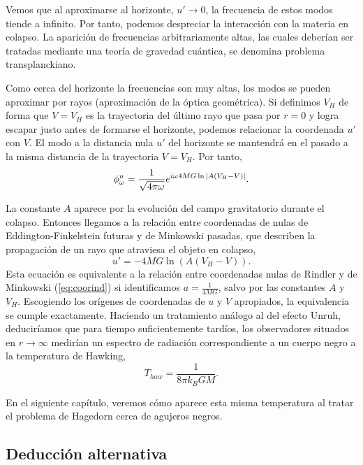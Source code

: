Vemos que al aproximarse al horizonte, $u'\to 0$, la frecuencia de estos modos tiende a infinito.
Por tanto, podemos despreciar la interacción con la materia en colapso.
La aparición de frecuencias arbitrariamente altas, las cuales deberían ser tratadas mediante
una teoría de gravedad cuántica, se denomina problema transplanckiano.

Como cerca del horizonte la frecuencias son muy altas, los modos se pueden aproximar por rayos (aproximación de la óptica geométrica).
Si definimos $V_H$ de forma que $V=V_H$ es la trayectoria del último rayo que pasa por $r=0$
y logra escapar justo antes de formarse el horizonte, podemos relacionar la coordenada
$u'$ con $V$.
El modo a la distancia nula $u'$ del horizonte se mantendrá en el pasado a la misma distancia de la trayectoria $V=V_H$.
Por tanto,
\begin{equation}
  \phi^{u}_\omega = \frac{1}{\sqrt{4\pi\omega}}e^{i\omega 4MG\ln \abs{A(V_H-V)}}.
\end{equation}

La constante $A$ aparece por la evolución del campo gravitatorio durante el colapso.
Entonces llegamos a la relación entre coordenadas de nulas de Eddington-Finkelstein futuras y de Minkowski pasadas,
que describen la propagación de un rayo que atraviesa el objeto en colapso,
\begin{equation}
  u'=-4MG\ln (A(V_H-V)).
\end{equation}
Esta ecuación es equivalente a la relación entre coordenadas nulas de Rindler y de Minkowski (\ref{eq:coorind}) si identificamos $a=\frac{1}{4MG}$, salvo por las constantes $A$ y $V_H$.
Escogiendo los orígenes de coordenadas de $u$ y $V$ apropiados, la equivalencia se cumple exactamente.
Haciendo un tratamiento análogo al del efecto Unruh, deduciríamos que para tiempo suficientemente tardíos,
los observadores situados en $r\to\infty$ medirían un espectro de radiación correspondiente a un 
cuerpo negro a la temperatura de Hawking,
\begin{equation}
  T_{haw}=\frac{1}{8\pi k_B G M}.
\end{equation}

En el siguiente capítulo, veremos cómo aparece esta misma temperatura al tratar el problema de Hagedorn
cerca de agujeros negros.

\subsection{Deducción alternativa}

